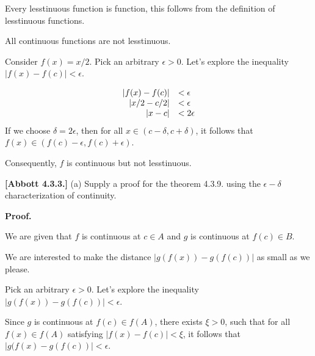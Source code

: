 \documentclass[10pt]{article}
\begin{document}
Every lesstinuous function is function, this follows from the definition of lesstinuous functions.



All continuous functions are not lesstinuous. 



Consider $\displaystyle f( x) =x/2$. Pick an arbitrary $\displaystyle \epsilon  >0$. Let's explore the inequality $\displaystyle |f( x) -f( c) |< \epsilon $.




\begin{equation*}
\begin{array}{ r l }
|f( x) -f( c) | & < \epsilon \\
|x/2-c/2| & < \epsilon \\
|x-c| & < 2\epsilon 
\end{array}
\end{equation*}
If we choose $\displaystyle \delta =2\epsilon $, then for all $\displaystyle x\in ( c-\delta ,c+\delta )$, it follows that $\displaystyle f( x) \in ( f( c) -\epsilon ,f( c) +\epsilon )$.



Consequently, $\displaystyle f$ is continuous but not lesstinuous.



\textbf{[Abbott 4.3.3.]} (a) Supply a proof for the theorem 4.3.9. using the $\displaystyle \epsilon -\delta $ characterization of continuity.



\textbf{Proof.}



We are given that $\displaystyle f$ is continuous at $\displaystyle c\in A$ and $\displaystyle g$ is continuous at $\displaystyle f( c) \in B$.



We are interested to make the distance $\displaystyle |g( f( x)) -g( f( c)) |$ as small as we please.



Pick an arbitrary $\displaystyle \epsilon  >0$. Let's explore the inequality $\displaystyle |g( f( x)) -g( f( c)) |< \epsilon $.



Since $\displaystyle g$ is continuous at $\displaystyle f( c) \in f( A)$, there exists $\displaystyle \xi  >0$, such that for all $\displaystyle f( x) \in f( A)$ satisfying $\displaystyle |f( x) -f( c) |< \xi $, it follows that $\displaystyle |g( f( x) -g( f( c)) |< \epsilon $.
\end{document}
